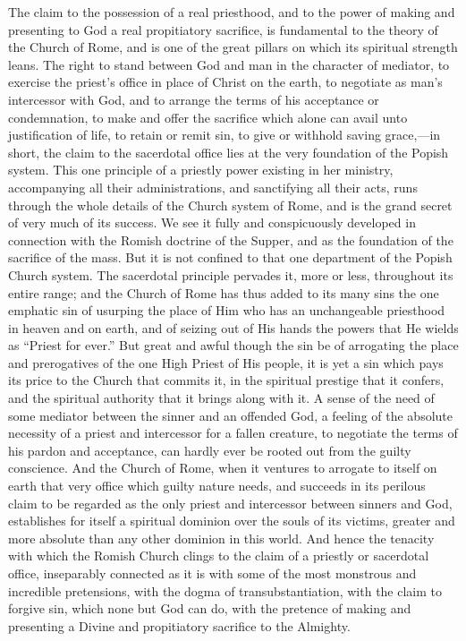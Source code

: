 \documentclass[]{book}
\begin{document}
The claim to the possession of a real priesthood, and to the power of making and presenting to God a real propitiatory sacrifice, is fundamental to the theory of the Church of Rome, and is one of the great pillars on which its spiritual strength leans. The right to stand between God and man in the character of mediator, to exercise the priest's office in place of Christ on the earth, to negotiate as man's intercessor with God, and to arrange the terms of his acceptance or condemnation, to make and offer the sacrifice which alone can avail unto justification of life, to retain or remit sin, to give or withhold saving grace,---in short, the claim to the sacerdotal office lies at the very foundation of the Popish system. This one principle of a priestly power existing in her ministry, accompanying all their administrations, and sanctifying all their acts, runs through the whole details of the Church system of Rome, and is the grand secret of very much of its success. We see it fully and conspicuously developed in connection with the Romish doctrine of the Supper, and as the foundation of the sacrifice of the mass. But it is not confined to that one department of the Popish Church system. The sacerdotal principle pervades it, more or less, throughout its entire range; and the Church of Rome has thus added to its many sins the one emphatic sin of usurping the place of Him who has an unchangeable priesthood in heaven and on earth, and of seizing out of His hands the powers that He wields as ``Priest for ever.'' But great and awful though the sin be of arrogating the place and prerogatives of the one High Priest of His people, it is yet a sin which pays its price to the Church that commits it, in the spiritual prestige that it confers, and the spiritual authority that it brings along with it. A sense of the need of some mediator between the sinner and an offended God, a feeling of the absolute necessity of a priest and intercessor for a fallen creature, to negotiate the terms of his pardon and acceptance, can hardly ever be rooted out from the guilty conscience. And the Church of Rome, when it ventures to arrogate to itself on earth that very office which guilty nature needs, and succeeds in its perilous claim to be regarded as the only priest and intercessor between sinners and God, establishes for itself a spiritual dominion over the souls of its victims, greater and more absolute than any other dominion in this world. And hence the tenacity with which the Romish Church clings to the claim of a priestly or sacerdotal office, inseparably connected as it is with some of the most monstrous and incredible pretensions, with the dogma of transubstantiation, with the claim to forgive sin, which none but God can do, with the pretence of making and presenting a Divine and propitiatory sacrifice to the Almighty.
\end{document}

